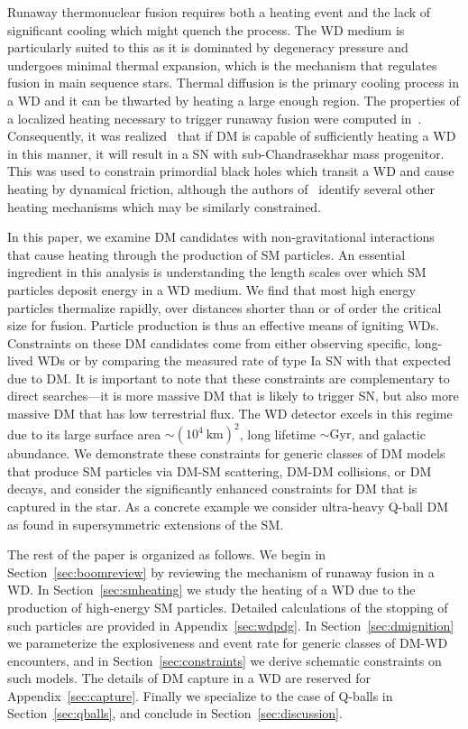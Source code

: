 \documentclass[preprintnumbers,amsmath,amssymb,prd,superscriptaddress]{revtex4}
\begin{document}
Runaway thermonuclear fusion requires both a heating event and the lack of significant cooling which might quench the process.
The WD medium is particularly suited to this as it is dominated by degeneracy pressure and undergoes minimal thermal expansion, which is the mechanism that regulates fusion in main sequence stars.
Thermal diffusion is the primary cooling process in a WD and it can be thwarted by heating a large enough region.
The properties of a localized heating necessary to trigger runaway fusion were computed in~\cite{Woosley}.
Consequently, it was realized~\cite{Graham:2015apa} that if DM is capable of sufficiently heating a WD in this manner, it will result in a SN with sub-Chandrasekhar mass progenitor.
This was used to constrain primordial black holes which transit a WD and cause heating by dynamical friction, although the authors of~\cite{Graham:2015apa} identify several other heating mechanisms which may be similarly constrained.

In this paper, we examine DM candidates with non-gravitational interactions that cause heating through the production of SM particles.
An essential ingredient in this analysis is understanding the length scales over which SM particles deposit energy in a WD medium.
We find that most high energy particles thermalize rapidly, over distances shorter than or of order the critical size for fusion. 
Particle production is thus an effective means of igniting WDs. 
Constraints on these DM candidates come from either observing specific, long-lived WDs or by comparing the measured rate of type Ia SN with that expected due to DM.
It is important to note that these constraints are complementary to direct searches---it is more massive DM that is likely to trigger SN, but also more massive DM that has low terrestrial flux.
The WD detector excels in this regime due to its large surface area $\sim (10^4~\text{km})^2$, long lifetime $\sim \text{Gyr}$, and galactic abundance.
We demonstrate these constraints for generic classes of DM models that produce SM particles via DM-SM scattering, DM-DM collisions, or DM decays, and consider the significantly enhanced constraints for DM that is captured in the star.
As a concrete example we consider ultra-heavy Q-ball DM as found in supersymmetric extensions of the SM. 

The rest of the paper is organized as follows.
We begin in Section~\ref{sec:boomreview} by reviewing the mechanism of runaway fusion in a WD.
In Section~\ref{sec:smheating} we study the heating of a WD due to the production of high-energy SM particles.
Detailed calculations of the stopping of such particles are provided in Appendix~\ref{sec:wdpdg}.
In Section~\ref{sec:dmignition} we parameterize the explosiveness and event rate for generic classes of DM-WD encounters, and in Section~\ref{sec:constraints} we derive schematic constraints on such models.
The details of DM capture in a WD are reserved for Appendix~\ref{sec:capture}.
Finally we specialize to the case of Q-balls in Section~\ref{sec:qballs}, and conclude in Section~\ref{sec:discussion}.
\end{document}
